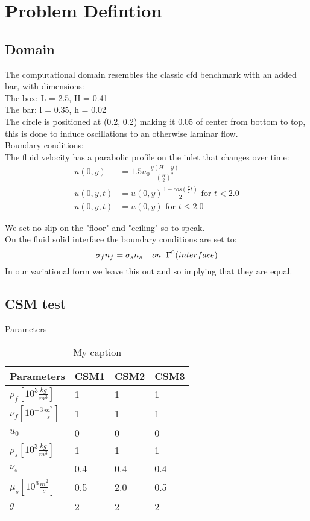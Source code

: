 



\section*{Problem Defintion}
\subsection*{Domain}
The computational domain resembles the classic cfd benchmark with an added bar, with dimensions: \\
The box: L = 2.5, H = 0.41 \\
The bar: l = 0.35, h = 0.02 \\
The circle is positioned at (0.2, 0.2) making it 0.05 of center from bottom to top, this is done to induce oscillations to an otherwise laminar flow.\\
Boundary conditions:\\
The fluid velocity has a parabolic profile on the inlet that changes over time:\\

\begin{align*}
u(0,y) &= 1.5u_0 \frac{y(H-y)}{(\frac{H}{2})^2}  \\
u(0,y,t) &= u(0,y)\frac{1-cos(\frac{\pi}{2}t)}{2} \text{  for  } t<2.0 \\
u(0,y,t) &= u(0,y) \text{  for  } t \leq 2.0
\end{align*}

We set no slip on the "floor" and "ceiling" so to speak.\\
On the fluid solid interface the boundary conditions are set to:
$$  \sigma_f n_f = \sigma_s n_s \hspace{4mm} on  \hspace{2mm}\Gamma^0 (interface)   $$
In our variational form we leave this out and so implying that they are equal.

\subsection*{CSM test}
Parameters
\begin{table}[h]
\centering
\caption{My caption}
\label{my-label}
\begin{tabular}{|l|l|l|l|}
\hline
Parameters & CSM1 & CSM2 & CSM3 \\ \hline
$\rho_f[10^3 \frac{kg}{m^3}]$ & 1 & 1 & 1 \\ \hline
$\nu_f [10^{-3} \frac{m^2}{s}]$ & 1 & 1 & 1 \\ \hline
$u_0$ & 0 & 0 & 0 \\ \hline
$\rho_s[10^3 \frac{kg}{m^3}]$ & 1 & 1 & 1 \\ \hline
$\nu_s$ & 0.4 & 0.4 & 0.4 \\ \hline
$\mu_s[10^6 \frac{m^2}{s}]$ & 0.5 & 2.0 & 0.5 \\ \hline
$g $ & 2 & 2 & 2 \\ \hline
\end{tabular}
\end{table}

